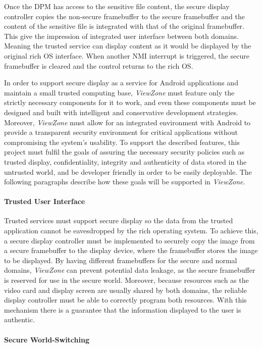 Once the \ac{DPM} has access to the sensitive file content, the secure display controller copies the non-secure framebuffer to the secure framebuffer and the content of the sensitive file is integrated with that of the original framebuffer. This give the impression of integrated user interface between both domains. Meaning the trusted service can display content as it would be displayed by the original rich OS interface. When another \ac{NMI} interrupt is triggered, the secure framebuffer is cleared and the control returns to the rich OS.

In order to support secure display as a service for Android applications and maintain a small trusted computing base, \emph{ViewZone} must feature only the strictly necessary components for it to work, and even these components must be designed and built with intelligent and conservative development strategies. Moreover, \emph{ViewZone} must allow for an integrated environment with Android to provide a transparent security environment for critical applications without compromising the system's usability. To support the described features, this project must fulfil the goals of assuring the necessary security policies such as trusted display, confidentiality, integrity and authenticity of data stored in the untrusted world, and be developer friendly in order to be easily deployable. The following paragraphs describe how these goals will be supported in \emph{ViewZone}.

\paragraph{\textbf{Trusted User Interface}}
Trusted services must support secure display so the data from the trusted application cannot be eavesdropped by the rich operating system. To achieve this, a secure display controller must be implemented to securely copy the image from a secure framebuffer to the display device, where the framebuffer stores the image to be displayed. By having different framebuffers for the secure and normal domains, \emph{ViewZone} can prevent potential data leakage, as the secure framebuffer is reserved for use in the secure world. Moreover, because resources such as the video card and display screen are usually shared by both domains, the reliable display controller must be able to correctly program both resources. With this mechanism there is a guarantee that the information displayed to the user is authentic.

\paragraph{\textbf{Secure World-Switching}}

